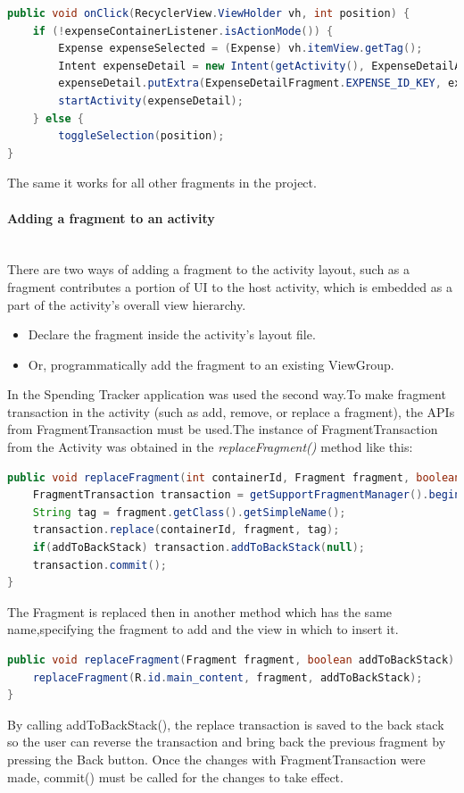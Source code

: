 \begin{lstlisting}[caption={Getting to the enclosing activity},label={Getting to the enclosing activity},language = Java]
public void onClick(RecyclerView.ViewHolder vh, int position) {
	if (!expenseContainerListener.isActionMode()) {
		Expense expenseSelected = (Expense) vh.itemView.getTag();
		Intent expenseDetail = new Intent(getActivity(), ExpenseDetailActivity.class);
		expenseDetail.putExtra(ExpenseDetailFragment.EXPENSE_ID_KEY, expenseSelected.getId());
		startActivity(expenseDetail);
	} else {
		toggleSelection(position);
}
\end{lstlisting}
The same it works for all other fragments in the project.
\paragraph{Adding a fragment to an activity}\mbox{}\\
There are two ways of adding a fragment to the activity layout, such as a fragment contributes a portion of UI to the host activity, which is embedded as a part of the activity's overall view hierarchy.
\begin{itemize}
	\item Declare the fragment inside the activity's layout file.
	\item Or, programmatically add the fragment to an existing ViewGroup.
\end{itemize}
In the Spending Tracker application was used the second way.To make fragment transaction in the activity (such as add, remove, or replace a fragment), the APIs from FragmentTransaction must be used.The instance of FragmentTransaction from the Activity was obtained in the \textit{replaceFragment()} method like this:
\begin{lstlisting}[caption={Instance of Fragment Transaction},label={Instance of Fragment Transaction},language = Java]
public void replaceFragment(int containerId, Fragment fragment, boolean addToBackStack) {
	FragmentTransaction transaction = getSupportFragmentManager().beginTransaction();
	String tag = fragment.getClass().getSimpleName();
	transaction.replace(containerId, fragment, tag);
	if(addToBackStack) transaction.addToBackStack(null);
	transaction.commit();
}
\end{lstlisting}
The Fragment is replaced then in another method which has the same name,specifying the fragment to add and the view in which to insert it.
\begin{lstlisting}[caption={Fragment replacing},label={Fragment replacing},language = Java]
public void replaceFragment(Fragment fragment, boolean addToBackStack) {
	replaceFragment(R.id.main_content, fragment, addToBackStack);
}
\end{lstlisting}
By calling addToBackStack(), the replace transaction is saved to the back stack so the user can reverse the transaction and bring back the previous fragment by pressing the Back button.
Once the changes with FragmentTransaction were made, commit() must be called for the changes to take effect.

